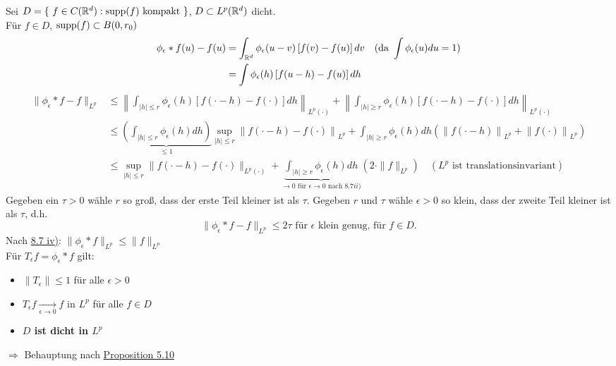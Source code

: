 \begin{beweis}
	Sei $D = \{ f \in C(\MdR^{d}): \supp(f) \text{ kompakt } \}$, $D \subset L^{p}(\mathbb{R}^{d})$ dicht. \\
	Für $f \in D$, $\operatorname{supp}(f) \subset B(0, r_{0})$
	\begin{align*}
		\phi_{\epsilon} \ast f(u) - f(u) & = \int_{\mathbb{R}^{d}} \phi_{\epsilon}(u - v) \left[ f(v) - f(u) \right] dv \quad (\text{da } \int \phi_{\epsilon}(u) du = 1 ) \\
		& = \int \phi_{\epsilon}(h) \left[ f(u - h) - f(u) \right] dh
	\end{align*} 
	\begin{align*}
		\| \phi_{\epsilon} \ast f - f \|_{L^{p}} & \leq \left\| \int_{|h| \leq r} \phi_{\epsilon}(h) \left[ f(\cdot - h) - f(\cdot) \right] dh \right\|_{L^{p}(\cdot)} + \left\| \int_{|h| \geq r} \phi_{\epsilon}(h) \left[ f(\cdot - h) - f(\cdot) \right] dh \right\|_{L^{p}(\cdot)} \\
		& \leq \underbrace{\left( \int_{|h| \leq r} \phi_{\epsilon}(h) dh \right)}_{\leq 1} \sup_{|h| \leq r} \left\| f(\cdot - h) - f(\cdot) \right\|_{L^{p}} + \int_{|h| \geq r} \phi_{\epsilon}(h) dh \left( \left\| f(\cdot - h) \right\|_{L^{p}} + \left\| f(\cdot) \right\|_{L^{p}} \right) \\
		& \leq \sup_{|h| \leq r} \| f( \cdot - h) - f(\cdot) \|_{L^{p}(\cdot)} + \underbrace{\int_{|h| \geq r} \phi_{\epsilon}(h) dh}_{\rightarrow 0 \text{ für } \epsilon \rightarrow 0 \text{ nach } \hyperref[bem:8.7ii]{8.7 ii)}} \left( 2 \cdot \| f \|_{L^{p}} \right) \quad  (L^{p} \text{ ist translationsinvariant})
	\end{align*}
	Gegeben ein $\tau > 0$ wähle $r$ so gro{\ss}, dass der erste Teil kleiner ist als $\tau$. Gegeben $r$ und $\tau$ wähle $\epsilon >0$ so klein, dass der zweite Teil kleiner ist als $\tau$, d.h.
	\[ \|\phi_{\epsilon} \ast f - f \|_{L^{p}} \leq 2 \tau \text{ für } \epsilon \text{ klein genug, für } f \in D. \]
	Nach \hyperref[bem:8.7iv]{8.7 iv)}: $\| \phi_{\epsilon} \ast f \|_{L^{p}} \leq \| f \|_{L^{p}}$ \\
	Für $T_{\epsilon} f = \phi_{\epsilon} \ast f$ gilt: 
	\begin{itemize}
		\item $\| T_{\epsilon} \| \leq 1$ für alle $\epsilon > 0$
		\item $T_{\epsilon} f \xrightarrow[\epsilon \rightarrow 0]{} f$ in $L^{p}$ für alle $f \in D$
		\item \textbf{$D$ ist dicht in $L^{p}$}
	\end{itemize}
	$\Rightarrow$ Behauptung nach \hyperref[prop:1-5.10]{Proposition 5.10} 
\end{beweis}


